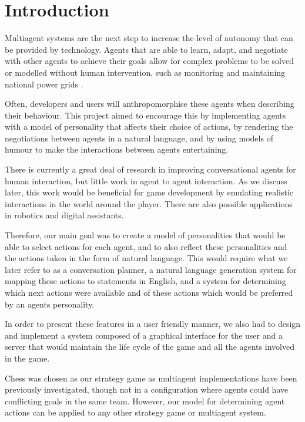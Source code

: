 \documentclass{article}
\begin{document}
\clearpage

\tableofcontents

\clearpage

\section{Introduction}

Multiagent systems are the next step to increase the level of autonomy that can be provided by technology. Agents that are able to learn, adapt, and negotiate with other agents to achieve their goals allow for complex problems to be solved or modelled without human intervention, such as monitoring and maintaining national power grids \cite{archon}. 

Often, developers and users will anthropomorphise these agents when describing their behaviour. This project aimed to encourage this by implementing agents with a model of personality that affects their choice of actions, by rendering the negotiations between agents in a natural language, and by using models of humour to make the interactions between agents entertaining. 

There is currently a great deal of research in improving conversational agents for human interaction, but little work in agent to agent interaction. As we discuss later, this work would be beneficial for game development by emulating realistic interactions in the world around the player. There are also possible applications in robotics and digital assistants. 

Therefore, our main goal was to create a model of personalities that would be able to select actions for each agent, and to also reflect these personalities and the actions taken in the form of natural language. This would require what we later refer to as a conversation planner, a natural language generation system for mapping these actions to statements in English, and a system for determining which next actions were available and of these actions which would be preferred by an agents personality.

In order to present these features in a user friendly manner, we also had to design and implement a system composed of a graphical interface for the user and a server that would maintain the life cycle of the game and all the agents involved in the game. 

Chess was chosen as our strategy game as multiagent implementations have been previously investigated, though not in a configuration where agents could have conflicting goals in the same team. However, our model for determining agent actions can be applied to any other strategy game or multiagent system.
\end{document}
